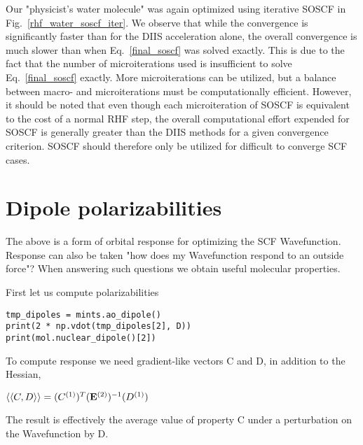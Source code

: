 \documentclass[aip,jcp,preprint,superscriptaddress,floatfix]{revtex4-1}
\begin{document}
Our "physicist's water molecule" was again optimized using iterative SOSCF in Fig.~\ref{rhf_water_soscf_iter}.
We observe that while the convergence is significantly faster than for the DIIS acceleration alone, the overall convergence is much slower than when Eq.~\ref{final_soscf} was solved exactly.
This is due to the fact that the number of microiterations used is insufficient to solve Eq.~\ref{final_soscf} exactly.
More microiterations can be utilized, but a balance between macro- and microiterations must be computationally efficient.
However, it should be noted that even though each microiteration of SOSCF is equivalent to the cost of a normal RHF step, the overall computational effort expended for SOSCF is generally greater than the DIIS methods for a given convergence criterion.
SOSCF should therefore only be utilized for difficult to converge SCF cases.

\section{Dipole polarizabilities}

The above is a form of orbital response for optimizing the SCF Wavefunction.
Response can also be taken "how does my Wavefunction respond to an outside force"?
When answering such questions we obtain useful molecular properties.

First let us compute polarizabilities

\begin{verbatim}
tmp_dipoles = mints.ao_dipole()
print(2 * np.vdot(tmp_dipoles[2], D))
print(mol.nuclear_dipole()[2])
\end{verbatim}

To compute response we need gradient-like vectors C and D, in addition to the Hessian,

$\langle \langle C, D \rangle \rangle =  (C^{(1)})^T ({\rm\bf E}^{(2)})^{-1}  (D^{(1)})  $

The result is effectively the average value of property C under a perturbation on the Wavefunction by D.



\end{document}
